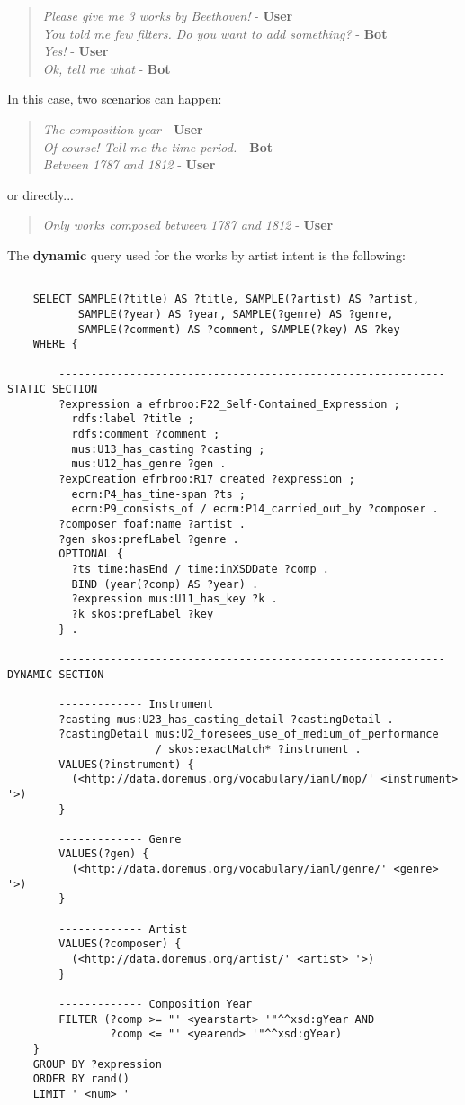 	\begin{verse}
	\textit{Please give me 3 works by Beethoven!} - \textbf{User}\\
	\textit{You told me few filters. Do you want to add something?} - \textbf{Bot}\\
	\textit{Yes!} - \textbf{User}\\
	\textit{Ok, tell me what} - \textbf{Bot}\\
	\end{verse}
	In this case, two scenarios can happen:
	\begin{verse}
	\textit{The composition year} - \textbf{User}\\
	\textit{Of course! Tell me the time period.} - \textbf{Bot}\\
	\textit{Between 1787 and 1812} - \textbf{User}\\
	\end{verse}
	or directly...
	\begin{verse}
	\textit{Only works composed between 1787 and 1812} - \textbf{User}\\
	\end{verse}
	The \textbf{dynamic} query used for the works by artist intent is the following:
	\begin{lstlisting}
	
	SELECT SAMPLE(?title) AS ?title, SAMPLE(?artist) AS ?artist,
	       SAMPLE(?year) AS ?year, SAMPLE(?genre) AS ?genre,
	       SAMPLE(?comment) AS ?comment, SAMPLE(?key) AS ?key
	WHERE {
	
		------------------------------------------------------------ STATIC SECTION
		?expression a efrbroo:F22_Self-Contained_Expression ;
		  rdfs:label ?title ;
		  rdfs:comment ?comment ;
		  mus:U13_has_casting ?casting ;
		  mus:U12_has_genre ?gen .
		?expCreation efrbroo:R17_created ?expression ;
		  ecrm:P4_has_time-span ?ts ;
		  ecrm:P9_consists_of / ecrm:P14_carried_out_by ?composer .
		?composer foaf:name ?artist .
		?gen skos:prefLabel ?genre .
		OPTIONAL {
		  ?ts time:hasEnd / time:inXSDDate ?comp .
		  BIND (year(?comp) AS ?year) .
		  ?expression mus:U11_has_key ?k .
		  ?k skos:prefLabel ?key
		} .
		
		------------------------------------------------------------ DYNAMIC SECTION
		
		------------- Instrument
		?casting mus:U23_has_casting_detail ?castingDetail .
		?castingDetail mus:U2_foresees_use_of_medium_of_performance
		               / skos:exactMatch* ?instrument .
		VALUES(?instrument) {
		  (<http://data.doremus.org/vocabulary/iaml/mop/' <instrument> '>)
		}
		
		------------- Genre
		VALUES(?gen) {
		  (<http://data.doremus.org/vocabulary/iaml/genre/' <genre> '>)
		}
		
		------------- Artist
		VALUES(?composer) {
		  (<http://data.doremus.org/artist/' <artist> '>)
		}
		
		------------- Composition Year
		FILTER (?comp >= "' <yearstart> '"^^xsd:gYear AND
		        ?comp <= "' <yearend> '"^^xsd:gYear)
	}
	GROUP BY ?expression
	ORDER BY rand()
	LIMIT ' <num> '
	\end{lstlisting}
